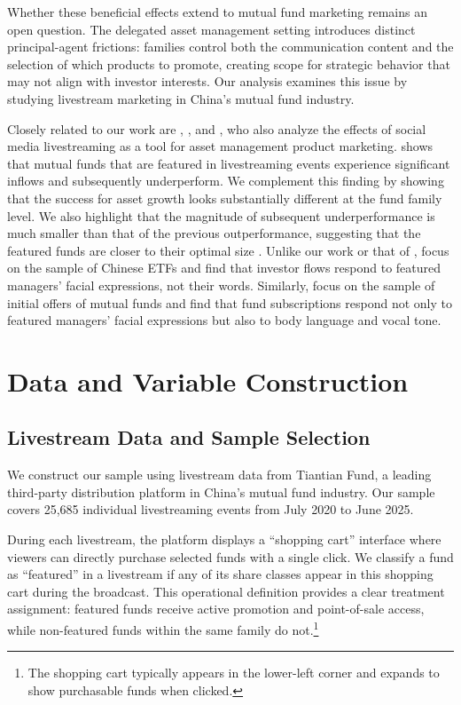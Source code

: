 \documentclass[12pt]{article}
\begin{document}
Whether these beneficial effects extend to mutual fund marketing remains an open question. The delegated asset management setting introduces distinct principal-agent frictions: families control both the communication content and the selection of which products to promote, creating scope for strategic behavior that may not align with investor interests. Our analysis examines this issue by studying livestream marketing in China's mutual fund industry.

Closely related to our work are \citet{dehaan2026social}, \citet{kacperczyk2026emotions}, and \citet{li2026the}, who also analyze the effects of social media livestreaming as a tool for asset management product marketing.\@ \citet{dehaan2026social} shows that mutual funds that are featured in livestreaming events experience significant inflows and subsequently underperform. We complement this finding by showing that the success for asset growth looks substantially different at the fund family level. We also highlight that the magnitude of subsequent underperformance is much smaller than that of the previous outperformance, suggesting that the featured funds are closer to their optimal size \citep{berk2015measuring,binsbergen2026capital}. Unlike our work or that of \citet{dehaan2026social}, \citet{kacperczyk2026emotions} focus on the sample of Chinese ETFs and find that investor flows respond to featured managers' facial expressions, not their words. Similarly, \citet{li2026the} focus on the sample of initial offers of mutual funds and find that fund subscriptions respond not only to featured managers' facial expressions but also to body language and vocal tone.

\section{Data and Variable Construction}\label{sec:data}

\subsection{Livestream Data and Sample Selection}\label{subsec:sample}

We construct our sample using livestream data from Tiantian Fund, a leading third-party distribution platform in China's mutual fund industry. Our sample covers 25,685 individual livestreaming events from July 2020 to June 2025.

During each livestream, the platform displays a ``shopping cart'' interface where viewers can directly purchase selected funds with a single click. We classify a fund as ``featured'' in a livestream if any of its share classes appear in this shopping cart during the broadcast. This operational definition provides a clear treatment assignment: featured funds receive active promotion and point-of-sale access, while non-featured funds within the same family do not.\footnote{The shopping cart typically appears in the lower-left corner and expands to show purchasable funds when clicked.}
\end{document}
